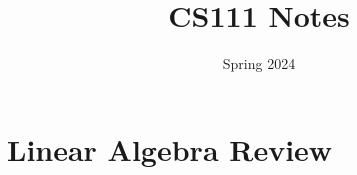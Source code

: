 \documentclass[12pt]{article}
\title{CS111 Notes}
\date{Spring 2024}
\begin{document}
    \maketitle
    \newpage
    \tableofcontents
    \newpage
    
    
    \section{Linear Algebra Review}
      \newpage
      \newpage
    
         \newpage
          \newpage


    \printindex
\end{document}
